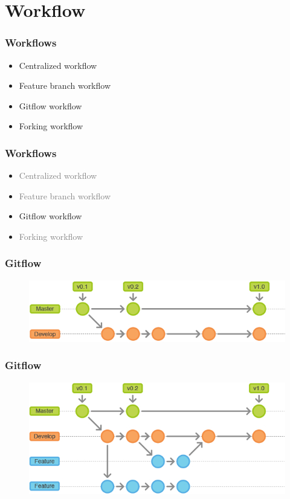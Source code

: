 \documentclass{beamer}
\begin{document}
\section{Workflow}

\begin{frame}
    \frametitle{Workflows}
    \begin{itemize}
        \item Centralized workflow
        \item Feature branch workflow
        \item Gitflow workflow
        \item Forking workflow
    \end{itemize}
\end{frame}

\begin{frame}
    \frametitle{Workflows}
    \begin{itemize}
        \item \textcolor{gray}{Centralized workflow}
        \item \textcolor{gray}{Feature branch workflow}
        \item Gitflow workflow
        \item \textcolor{gray}{Forking workflow}
    \end{itemize}
\end{frame}

\begin{frame}
    \frametitle{Gitflow}
    \begin{figure}[h!]
        \begin{center}
            \includegraphics[scale=0.5]{gitflow2.png}
        \end{center}
    \end{figure}
\end{frame}

\begin{frame}
    \frametitle{Gitflow}
    \begin{figure}[h!]
        \begin{center}
            \includegraphics[scale=0.5]{gitflow3.png}
        \end{center}
    \end{figure}
\end{frame}
\end{document}
